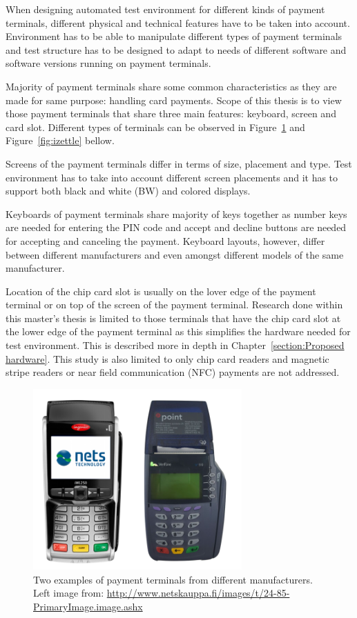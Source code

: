 When designing automated test environment for different kinds of payment terminals, different physical and technical features have to be taken into account. Environment has to be able to manipulate different types of payment terminals and test structure has to be designed to adapt to needs of different software and software versions running on payment terminals.

Majority of payment terminals share some common characteristics as they are made for same purpose: handling card payments. Scope of this thesis is to view those payment terminals that share three main features: keyboard, screen and card slot. Different types of terminals can be observed in Figure~\ref{fig:terminals} and Figure~\ref{fig:izettle} bellow.

Screens of the payment terminals differ in terms of size, placement and type. Test environment has to take into account different screen placements and it has to support both black and white (BW) and colored displays.

Keyboards of payment terminals share majority of keys together as number keys are needed for entering the PIN code and accept and decline buttons are needed for accepting and canceling the payment. Keyboard layouts, however, differ between different manufacturers and even amongst different models of the same manufacturer.

Location of the chip card slot is usually on the lover edge of the payment terminal or on top of the screen of the payment terminal. Research done within this master's thesis is limited to those terminals that have the chip card slot at the lower edge of the payment terminal as this simplifies the hardware needed for test environment. This is described more in depth in Chapter~\ref{section:Proposed hardware}. This study is also limited to only chip card readers and magnetic stripe readers or near field communication (NFC) payments are not addressed.

\begin{figure}[ht]
  \begin{center}
    \includegraphics[width=8cm]{images/terminal1.png}
    \caption{Two examples of payment terminals from different manufacturers. Left image from: \url{http://www.netskauppa.fi/images/t/24-85-PrimaryImage.image.ashx}}
    \label{fig:terminals}
  \end{center}
\end{figure}

